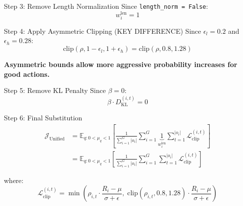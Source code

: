 \documentclass[11pt,a4paper]{article}
\begin{document}
\begin{proofbox}{Step 3: Remove Length Normalization}
Since \texttt{length\_norm = False}:
\begin{equation}
w_i^{\text{len}} = 1
\end{equation}
\end{proofbox}

\begin{proofbox}{Step 4: Apply Asymmetric Clipping (KEY DIFFERENCE)}
Since $\epsilon_l = 0.2$ and $\epsilon_h = 0.28$:
\begin{equation}
\text{clip}(\rho, 1-\epsilon_l, 1+\epsilon_h) = \text{clip}(\rho, 0.8, 1.28)
\end{equation}

\textbf{Asymmetric bounds allow more aggressive probability increases for good actions.}
\end{proofbox}

\begin{proofbox}{Step 5: Remove KL Penalty}
Since $\beta = 0$:
\begin{equation}
\beta \cdot D_{\text{KL}}^{(i,t)} = 0
\end{equation}
\end{proofbox}

\begin{proofbox}{Step 6: Final Substitution}
\begin{align}
\mathcal{J}_{\text{Unified}} &= \mathbb{E}_{q: 0 < \mu_q < 1} \left[ \frac{1}{\sum_{i=1}^G |o_i|} \sum_{i=1}^{G} \underbrace{1}_{w_i^{\text{len}}} \sum_{t=1}^{|o_i|} \mathcal{L}_{\text{clip}}^{(i,t)} \right] \\[10pt]
&= \mathbb{E}_{q: 0 < \mu_q < 1} \left[ \frac{1}{\sum_{i=1}^G |o_i|} \sum_{i=1}^{G} \sum_{t=1}^{|o_i|} \mathcal{L}_{\text{clip}}^{(i,t)} \right]
\end{align}

where:
\begin{equation}
\mathcal{L}_{\text{clip}}^{(i,t)} = \min\left( \rho_{i,t} \cdot \frac{R_i - \mu}{\sigma + \epsilon}, \; \text{clip}(\rho_{i,t}, 0.8, 1.28) \cdot \frac{R_i - \mu}{\sigma + \epsilon} \right)
\end{equation}
\end{proofbox}
\end{document}
